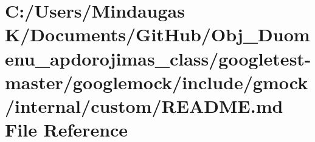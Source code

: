 \hypertarget{googletest-master_2googlemock_2include_2gmock_2internal_2custom_2_r_e_a_d_m_e_8md}{}\section{C\+:/\+Users/\+Mindaugas K/\+Documents/\+Git\+Hub/\+Obj\+\_\+\+Duomenu\+\_\+apdorojimas\+\_\+class/googletest-\/master/googlemock/include/gmock/internal/custom/\+R\+E\+A\+D\+ME.md File Reference}
\label{googletest-master_2googlemock_2include_2gmock_2internal_2custom_2_r_e_a_d_m_e_8md}
